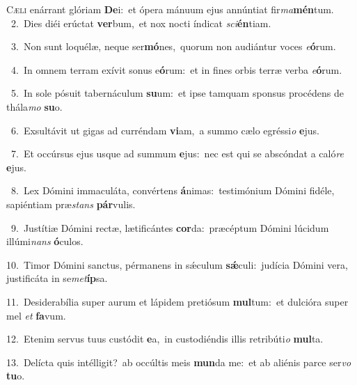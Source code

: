 \lettrine{\initial\textcolor{\initialcolor}{C}}{æli} enárrant glóriam \textbf{De}\-i:~\star et ópera mánuum ejus annúntiat fir\-\textit{ma}\-\textbf{mén}tum.\\
{\numbfont\textcolor{\numbcolor}{~2.}}~Dies diéi erúctat \textbf{ver}\-bum,~\star et nox nocti índicat \textit{sci}\-\textbf{én}tiam.\par
{\numbfont\textcolor{\numbcolor}{~3.}}~Non sunt loquélæ, neque ser\-\textbf{mó}\-nes,~\star quorum non audiántur voces \textit{e}\-\textbf{ó}rum.\par
{\numbfont\textcolor{\numbcolor}{~4.}}~In omnem terram exívit sonus e\-\textbf{ó}\-rum:~\star et in fines orbis terræ verba \textit{e}\-\textbf{ó}rum.\par
{\numbfont\textcolor{\numbcolor}{~5.}}~In sole pósuit tabernáculum \textbf{su}\-um:~\star et ipse tamquam sponsus procédens de thála\textit{mo} \textbf{su}\-o.\par
{\numbfont\textcolor{\numbcolor}{~6.}}~Exsultávit ut gigas ad curréndam \textbf{vi}\-am,~\star a summo cælo egréssi\textit{o} \textbf{e}\-jus.\par
{\numbfont\textcolor{\numbcolor}{~7.}}~Et occúrsus ejus usque ad summum \textbf{e}\-jus:~\star nec est qui se abscóndat a caló\textit{re} \textbf{e}\-jus.\par
{\numbfont\textcolor{\numbcolor}{~8.}}~Lex Dómini immaculáta, convértens \textbf{á}\-nimas:~\star testimónium Dómini fidéle, sapiéntiam præ\textit{stans} \textbf{pár}\-vulis.\par
{\numbfont\textcolor{\numbcolor}{~9.}}~Justítiæ Dómini rectæ, lætificántes \textbf{cor}\-da:~\star præcéptum Dómini lúcidum illúmi\textit{nans} \textbf{ó}\-culos.\par
{\numbfont\textcolor{\numbcolor}{10.}}~Timor Dómini sanctus, pérmanens in sǽculum \textbf{sǽ}\-culi:~\star judícia Dómini vera, justificáta in se\-\textit{met}\-\textbf{íp}sa.\par
{\numbfont\textcolor{\numbcolor}{11.}}~Desiderabília super aurum et lápidem pretiósum \textbf{mul}\-tum:~\star et dulcióra super mel \textit{et} \textbf{fa}\-vum.\par
{\numbfont\textcolor{\numbcolor}{12.}}~Etenim servus tuus custódit \textbf{e}\-a,~\star in custodiéndis illis retribúti\textit{o} \textbf{mul}\-ta.\par
{\numbfont\textcolor{\numbcolor}{13.}}~Delícta quis intélligit?~\dagger ab occúltis meis \textbf{mun}\-da me:~\star et ab aliénis parce ser\textit{vo} \textbf{tu}\-o.\par
